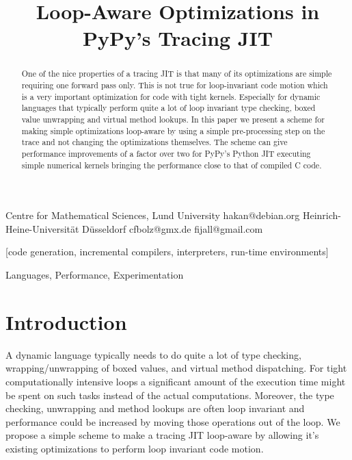 \documentclass[preprint]{sigplanconf}
\begin{document}
\copyrightdata{[to be supplied]} 


\title{Loop-Aware Optimizations in PyPy's Tracing JIT}

           {Centre for Mathematical Sciences, Lund University}
           {hakan@debian.org}
           {Heinrich-Heine-Universität Düsseldorf}
           {cfbolz@gmx.de}
           {}
           {fijall@gmail.com}

\maketitle

\begin{abstract}
One of the nice properties of a tracing JIT is that many of its optimizations
are simple requiring one forward pass only. This is not true for loop-invariant code
motion which is a very important optimization for code with tight kernels.
Especially for dynamic languages that typically perform quite a lot of loop invariant
type checking, boxed value unwrapping and virtual method lookups.
In this paper we present a scheme for making simple optimizations loop-aware by
using a simple pre-processing step on the trace and not changing the
optimizations themselves. The scheme can give performance improvements of a
factor over two for PyPy's Python JIT executing simple numerical kernels
bringing the performance close to that of compiled C code.
\end{abstract}

[code generation,
incremental compilers, interpreters, run-time environments]

\terms
Languages, Performance, Experimentation


\section{Introduction}

A dynamic language typically needs to do quite a lot of type
checking, wrapping/unwrapping of boxed values, and virtual method dispatching. 
For tight computationally intensive loops a
significant amount of the execution time might be spent on such tasks
instead of the actual computations. Moreover, the type checking,
unwrapping and method lookups are often loop invariant and performance could be increased
by moving those operations out of the loop. We propose a simple scheme
to make a tracing JIT loop-aware by allowing it's existing optimizations to
perform loop invariant code motion. 
\end{document}
